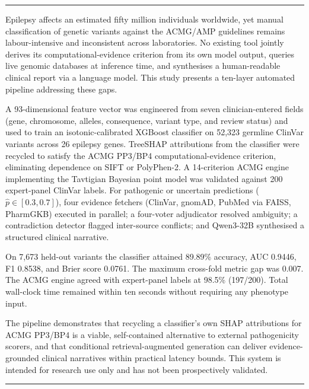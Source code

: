 \documentclass[12pt,a4paper]{article}
\begin{document}
\noindent\rule{\textwidth}{0.4pt}
\begin{description}[leftmargin=0pt, labelwidth=!, labelsep=0.3em,
                    font=\normalfont\bfseries, itemsep=2pt]

\item[Background \& objectives:]
Epilepsy affects an estimated fifty million individuals worldwide, yet
manual classification of genetic variants against the ACMG/AMP guidelines
remains labour-intensive and inconsistent across laboratories.
No existing tool jointly derives its computational-evidence criterion
from its own model output, queries live genomic databases at inference time,
and synthesises a human-readable clinical report via a language model.
This study presents a ten-layer automated pipeline addressing these gaps.

\item[Methods:]
A 93-dimensional feature vector was engineered from seven clinician-entered
fields (gene, chromosome, alleles, consequence, variant type, and review
status) and used to train an isotonic-calibrated XGBoost classifier on
52,323 germline ClinVar variants across 26 epilepsy genes.
TreeSHAP attributions from the classifier were recycled to satisfy the
ACMG PP3/BP4 computational-evidence criterion, eliminating dependence on
SIFT or PolyPhen-2. A 14-criterion ACMG engine implementing the Tavtigian
Bayesian point model was validated against 200 expert-panel ClinVar labels.
For pathogenic or uncertain predictions ($\hat{p}\in[0.3,0.7]$), four
evidence fetchers (ClinVar, gnomAD, PubMed via FAISS, PharmGKB) executed in
parallel; a four-voter adjudicator resolved ambiguity; a contradiction
detector flagged inter-source conflicts; and Qwen3-32B synthesised a
structured clinical narrative.

\item[Results:]
On 7,673 held-out variants the classifier attained 89.89\% accuracy,
AUC 0.9446, F1 0.8538, and Brier score 0.0761.
The maximum cross-fold metric gap was 0.007.
The ACMG engine agreed with expert-panel labels at 98.5\% (197/200).
Total wall-clock time remained within ten seconds without requiring any
phenotype input.

\item[Interpretation \& conclusions:]
The pipeline demonstrates that recycling a classifier's own SHAP
attributions for ACMG PP3/BP4 is a viable, self-contained alternative to
external pathogenicity scorers, and that conditional retrieval-augmented
generation can deliver evidence-grounded clinical narratives within
practical latency bounds. This system is intended for research use only
and has not been prospectively validated.

\end{description}
\noindent\rule{\textwidth}{0.4pt}
\end{document}
